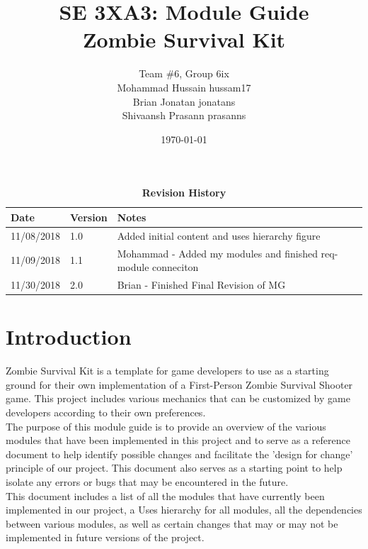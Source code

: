 \documentclass[12pt, titlepage]{article}
\title{SE 3XA3: Module Guide\\Zombie Survival Kit}
\author{Team \#6, Group 6ix
		\\ Mohammad Hussain hussam17
		\\ Brian Jonatan jonatans
		\\ Shivaansh Prasann prasanns
}
\date{\today}
\begin{document}
\maketitle

\tableofcontents
\listoftables
\listoffigures

\begin{table}[bp]
\caption{\bf Revision History}
\begin{tabularx}{\textwidth}{p{3cm}p{2cm}X}
\toprule {\bf Date} & {\bf Version} & {\bf Notes}\\
\midrule
11/08/2018 & 1.0 & Added initial content and uses hierarchy figure\\
11/09/2018 & 1.1 & Mohammad - Added my modules and finished req-module conneciton\\
11/30/2018 & 2.0 & Brian - Finished Final Revision of MG\\
\bottomrule
\end{tabularx}
\end{table}

\newpage


\section{Introduction}


Zombie Survival Kit is a template for game developers to use as a starting ground for their own implementation of a First-Person Zombie Survival Shooter game. This project includes various mechanics that can be customized by game developers according to their own preferences.\\
\newline
The purpose of this module guide is to provide an overview of the various modules that have been implemented in this project and to serve as a reference document to help identify possible changes and facilitate the 'design for change' principle of our project. This document also serves as a starting point to help isolate any errors or bugs that may be encountered in the future.\\
\newline
This document includes a list of all the modules that have currently been implemented in our project, a Uses hierarchy for all modules, all the dependencies between various modules, as well as certain changes that may or may not be implemented in future versions of the project.

\end{document}
